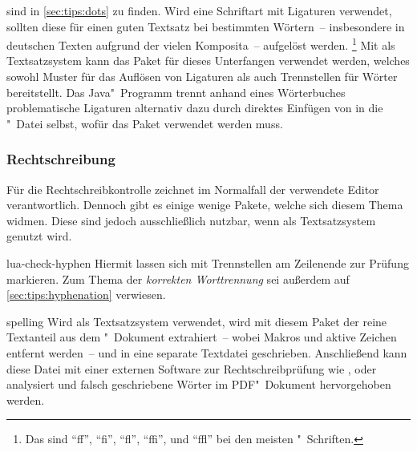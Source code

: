 \begin{packages}
  sind in \autoref{sec:tips:dots} zu finden.
% 
  Wird eine Schriftart mit Ligaturen verwendet, sollten diese für einen guten 
  Textsatz bei bestimmten Wörtern~-- insbesondere in deutschen Texten aufgrund 
  der vielen Komposita~-- aufgelöst werden.%
  \footnote{%
    Das sind \enquote{ff}, \enquote{fi}, \enquote{fl}, \enquote{ffi}, und 
    \enquote{ffl} bei den meisten "~Schriften.%
  }
  Mit  als Textsatzsystem kann das Paket  
  für dieses Unterfangen verwendet werden, welches sowohl Muster für das 
  Auflösen von Ligaturen als auch Trennstellen für Wörter bereitstellt. 
  Das Java"~Programm  trennt anhand eines Wörterbuches 
  problematische Ligaturen alternativ dazu durch direktes Einfügen von 
   in die "~Datei selbst, wofür das Paket 
   verwendet werden muss.
\end{packages}
%



\subsubsection{%
  Rechtschreibung%
}
%
Für die Rechtschreibkontrolle zeichnet im Normalfall der verwendete Editor 
verantwortlich. Dennoch gibt es einige wenige Pakete, welche sich diesem Thema 
widmen. Diese sind jedoch ausschließlich nutzbar, wenn als Textsatzsystem 
 genutzt wird.
\begin{packages}
\item[lua-check-hyphen]
  Hiermit lassen sich mit  Trennstellen am Zeilenende zur 
  Prüfung markieren. Zum Thema der \textit{korrekten Worttrennung} sei außerdem 
  auf \autoref{sec:tips:hyphenation} verwiesen.
\item[spelling]
  Wird  als Textsatzsystem verwendet, wird mit diesem Paket 
  der reine Textanteil aus dem "~Dokument extrahiert~-- wobei 
  Makros und aktive Zeichen entfernt werden~-- und in eine separate Textdatei 
  geschrieben. Anschließend kann diese Datei mit einer externen Software zur  
  Rechtschreibprüfung wie ,  oder 
   analysiert und falsch geschriebene Wörter im 
  PDF"~Dokument hervorgehoben werden.
\end{packages}
%



